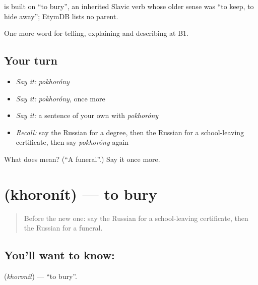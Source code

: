 \begin{cousinweb}
\emph{} is built on \emph{} \textquotedblleft{}to bury\textquotedblright{}, an inherited Slavic verb whose older sense was \textquotedblleft{}to keep, to hide away\textquotedblright{}; EtymDB lists no parent.
\end{cousinweb}

\begin{grammarlens}[title={What you've built}]
One more word for telling, explaining and describing at B1.
\end{grammarlens}

\subsection*{Your turn}
\begin{itemize}
\raggedright
  \item \emph{Say it:} \emph{pokhoróny}
  \item \emph{Say it:} \emph{pokhoróny}, once more
  \item \emph{Say it:} a sentence of your own with \emph{pokhoróny}
  \item \emph{Recall:} say the Russian for a degree, then the Russian for a school-leaving certificate, then say \emph{pokhoróny} again
\end{itemize}

\begin{tcolorbox}[breakable,colback=teal!4,colframe=teal!35!black,title={Before you move on}]
What does  mean? (\textquotedblleft{}A funeral\textquotedblright{}.) Say it once more.
\end{tcolorbox}
\section[\texorpdfstring{\ru{хоронить} (khoronít)}{хоронить (khoronít)}]{ (khoronít) — to bury}

\label{lesson:RU-C309-khoronit}



\begin{quote}
Before the new one: say the Russian for a school-leaving certificate, then the Russian for a funeral.
\end{quote}

\subsection*{You'll want to know: }
\textbf{} (\emph{khoronít}) — \textquotedblleft{}to bury\textquotedblright{}.

